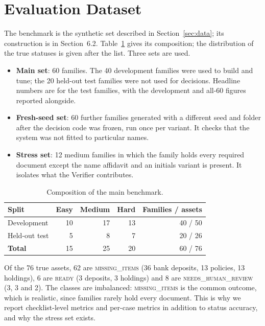 \section{Evaluation Dataset}\label{sec:dataset}
The benchmark is the synthetic set described in Section~\ref{sec:data}; its construction is in Section~6.2. Table~\ref{tab:dataset} gives its composition; the distribution of the true statuses is given after the list. Three sets are used.

\begin{itemize}[leftmargin=*,itemsep=2pt]
\item \textbf{Main set}: 60 families. The 40 development families were used to build and tune; the 20 held-out test families were not used for decisions. Headline numbers are for the test families, with the development and all-60 figures reported alongside.
\item \textbf{Fresh-seed set}: 60 further families generated with a different seed and folder after the decision code was frozen, run once per variant. It checks that the system was not fitted to particular names.
\item \textbf{Stress set}: 12 medium families in which the family holds every required document except the name affidavit and an initials variant is present. It isolates what the Verifier contributes.
\end{itemize}

\begin{table}[H]
\centering\small{}
\caption{Composition of the main benchmark.}\label{tab:dataset}
\renewcommand{\arraystretch}{1.1}
\begin{tabular}{@{}lrrrr@{}}
\toprule
\textbf{Split} & \textbf{Easy} & \textbf{Medium} & \textbf{Hard} & \textbf{Families / assets} \\ \midrule
Development & 10 & 17 & 13 & 40 / 50 \\
Held-out test & 5 & 8 & 7 & 20 / 26 \\
\textbf{Total} & 15 & 25 & 20 & 60 / 76 \\ \bottomrule
\end{tabular}
\end{table}

Of the 76 true assets, 62 are \textsc{missing\_items} (36 bank deposits, 13 policies, 13 holdings), 6 are \textsc{ready} (3 deposits, 3 holdings) and 8 are \textsc{needs\_human\_review} (3, 3 and 2). The classes are imbalanced: \textsc{missing\_items} is the common outcome, which is realistic, since families rarely hold every document. This is why we report checklist-level metrics and per-case metrics in addition to status accuracy, and why the stress set exists.

